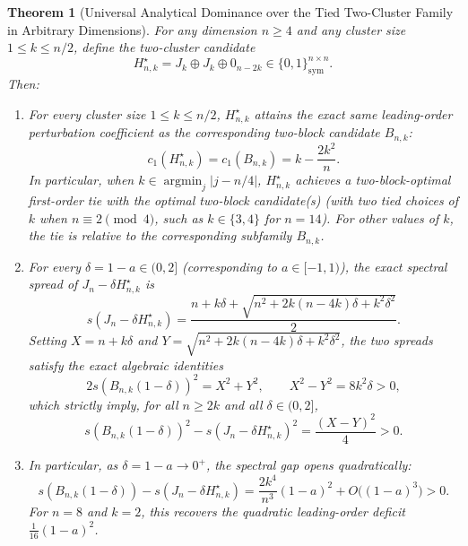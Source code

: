 \documentclass[11pt,reqno]{article}
\newtheorem{theorem}{Theorem}[section]
\theoremstyle{definition}
\begin{document}
\begin{theorem}[Universal Analytical Dominance over the Tied Two-Cluster Family in Arbitrary Dimensions]\label{thm:universal-tied-elim}
For any dimension $n \ge 4$ and any cluster size $1 \le k \le n/2$, define the two-cluster candidate
\begin{equation}
H^\star_{n, k} = J_k \oplus J_k \oplus 0_{n-2k} \in \{0, 1\}^{n \times n}_{\mathrm{sym}}.
\end{equation}
Then:
\begin{enumerate}
    \item For every cluster size $1 \le k \le n/2$, $H^\star_{n, k}$ attains the exact same leading-order perturbation coefficient as the corresponding two-block candidate $B_{n, k}$:
    \begin{equation}
    c_1(H^\star_{n, k}) = c_1(B_{n, k}) = k - \frac{2k^2}{n}.
    \end{equation}
    In particular, when $k \in \operatorname{argmin}_{j} |j - n/4|$, $H^\star_{n, k}$ achieves a two-block-optimal first-order tie with the optimal two-block candidate(s) (with two tied choices of $k$ when $n \equiv 2 \pmod 4$, such as $k \in \{3, 4\}$ for $n=14$). For other values of $k$, the tie is relative to the corresponding subfamily $B_{n, k}$.
    \item For every $\delta = 1 - a \in (0, 2]$ (corresponding to $a \in [-1, 1)$), the exact spectral spread of $J_n - \delta H^\star_{n, k}$ is
    \begin{equation}
    s(J_n - \delta H^\star_{n, k}) = \frac{n + k\delta + \sqrt{n^2 + 2k(n - 4k)\delta + k^2\delta^2}}{2}.
    \end{equation}
    Setting $X = n + k\delta$ and $Y = \sqrt{n^2 + 2k(n - 4k)\delta + k^2\delta^2}$, the two spreads satisfy the exact algebraic identities
    \begin{equation}
    2 s(B_{n, k}(1-\delta))^2 = X^2 + Y^2, \qquad X^2 - Y^2 = 8k^2\delta > 0,
    \end{equation}
    which strictly imply, for all $n \ge 2k$ and all $\delta \in (0, 2]$,
    \begin{equation}\label{eq:universal-tied-gap}
    s(B_{n, k}(1-\delta))^2 - s(J_n - \delta H^\star_{n, k})^2 = \frac{(X - Y)^2}{4} > 0.
    \end{equation}
    \item In particular, as $\delta = 1 - a \to 0^+$, the spectral gap opens quadratically:
    \begin{equation}
    s(B_{n, k}(1-\delta)) - s(J_n - \delta H^\star_{n, k}) = \frac{2k^4}{n^3}(1-a)^2 + O\bigl((1-a)^3\bigr) > 0.
    \end{equation}
    For $n=8$ and $k=2$, this recovers the quadratic leading-order deficit $\frac{1}{16}(1-a)^2$.
\end{enumerate}
\end{theorem}
\end{document}
